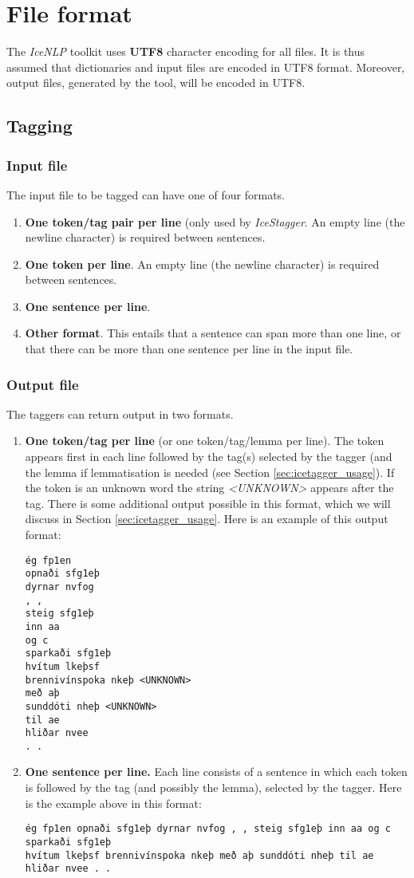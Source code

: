 \documentclass[11pt]{article}
\begin{document}
\section{File format}
The \emph{IceNLP} toolkit uses \textbf{UTF8} character encoding for all files.
It is thus assumed that dictionaries and input files are encoded in UTF8 format.
Moreover, output files, generated by the tool, will be encoded in UTF8.

\subsection{Tagging}
\subsubsection{Input file}
The input file to be tagged can have one of four formats.
\begin{enumerate}
\item {\bf One token/tag pair per line} (only used by \emph{IceStagger}. An empty line (the newline character) is required between sentences.
\item {\bf One token per line}. An empty line (the newline character) is required between sentences.
\item {\bf One sentence per line}.
\item {\bf Other format}. This entails that a sentence can span more than one line, or that there can be more than one sentence per line in the input file.
\end{enumerate}

\subsubsection{Output file}
The taggers can return output in two formats.
\begin{enumerate}
\item {\bf One token/tag per line} (or one token/tag/lemma per line).
The token appears first in each line followed by the tag(s) selected by the tagger (and the lemma if lemmatisation is needed (see Section \ref{sec:icetagger_usage}).
If the token is an unknown word the string \emph{<UNKNOWN>} appears after the tag.
There is some additional output possible in this format, which we will discuss in Section \ref{sec:icetagger_usage}.
Here is an example of this output format:
\begin{verbatim}
ég fp1en
opnaði sfg1eþ
dyrnar nvfog
, ,
steig sfg1eþ
inn aa
og c
sparkaði sfg1eþ
hvítum lkeþsf
brennivínspoka nkeþ <UNKNOWN>
með aþ
sunddóti nheþ <UNKNOWN>
til ae
hliðar nvee
. .
\end{verbatim}

\item {\bf One sentence per line. }
Each line consists of a sentence in which each token is followed by the tag (and possibly the lemma), selected by the tagger.
Here is the example above in this format:
\begin{verbatim}
ég fp1en opnaði sfg1eþ dyrnar nvfog , , steig sfg1eþ inn aa og c sparkaði sfg1eþ
hvítum lkeþsf brennivínspoka nkeþ með aþ sunddóti nheþ til ae hliðar nvee . .
\end{verbatim}
\end{enumerate}
\end{document}
